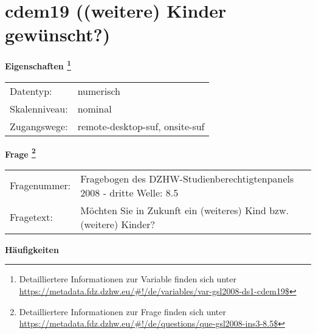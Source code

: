 
    \setcounter{footnote}{0}

    \vspace*{-1.8cm}
	\section{cdem19 ((weitere) Kinder gewünscht?)}
	\label{section:cdem19}



    \vspace*{0.5cm}
    \noindent\textbf{Eigenschaften
	\footnote{Detailliertere Informationen zur Variable finden sich unter
		\url{https://metadata.fdz.dzhw.eu/\#!/de/variables/var-gsl2008-ds1-cdem19$}}}\\
	\begin{tabularx}{\hsize}{@{}lX}
	Datentyp: & numerisch \\
	Skalenniveau: & nominal \\
	Zugangswege: &
	  remote-desktop-suf, 
	  onsite-suf
 \\
    \end{tabularx}



				\vspace*{0.5cm}
                \noindent\textbf{Frage
	                \footnote{Detailliertere Informationen zur Frage finden sich unter
		              \url{https://metadata.fdz.dzhw.eu/\#!/de/questions/que-gsl2008-ins3-8.5$}}}\\
				\begin{tabularx}{\hsize}{@{}lX}
					Fragenummer: &
					  Fragebogen des DZHW-Studienberechtigtenpanels 2008 - dritte Welle:
					  8.5
 \\
					Fragetext: & Möchten Sie in Zukunft ein (weiteres) Kind bzw. (weitere) Kinder? \\
				\end{tabularx}





        		\vspace*{0.5cm}
                \noindent\textbf{Häufigkeiten}


